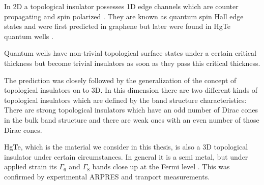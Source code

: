 	In 2D a topological insulator possesses 1D edge channels which are counter propagating and spin polarized \cite{Kane_Mele2}. They are known as quantum spin Hall edge states and were first predicted in graphene \cite{Kane_Mele2} but later were found in HgTe quantum wells \cite{Bernevig}. 
	
	Quantum wells have non-trivial topological surface states under a certain critical thickness but become trivial insulators as soon as they pass this critical thickness. 
	
	The prediction was closely followed by the generalization of the concept of topological insulators on to 3D. 
	In this dimension there are two different kinds of topological insulators which are defined by the band structure characteristics: There are strong topological insulators which have an odd number of Dirac cones in the bulk band structure and there are weak ones with an even number of those Dirac cones. 
	
	HgTe, which is the material we consider in this thesis, is also a 3D topological insulator under certain circumstances. In general it is a semi metal, but under applied strain its $\Gamma_6$ and $\Gamma_8$ bands close up at the Fermi level \cite{textbook_ti}. This was confirmed by experimental ARPRES and tranport measurements. 
	
